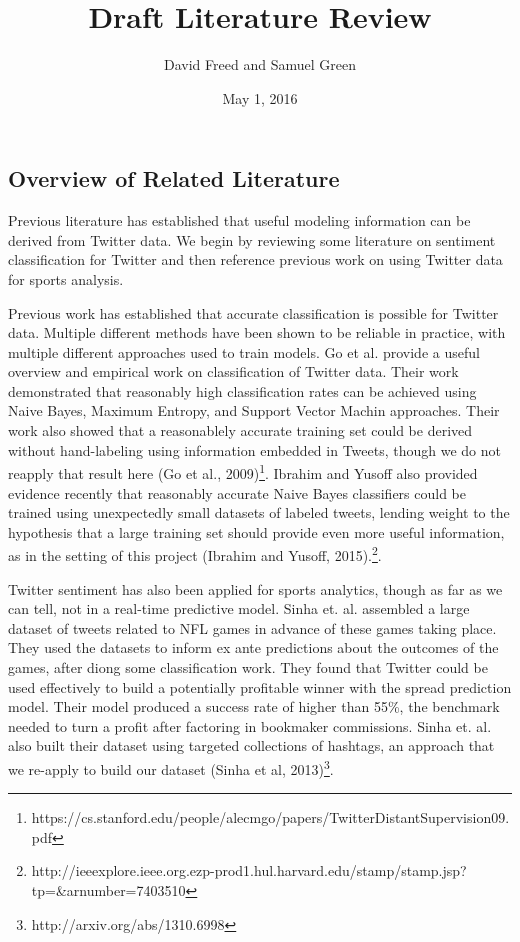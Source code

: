 \documentclass[12pt]{article}
\begin{document}
\setcounter{page}{1}
\begin{doublespacing}

\title{Draft Literature Review}
\author{David Freed and Samuel Green}
\date{May 1, 2016}
\maketitle

\section{Overview of Related Literature}

Previous literature has established that useful modeling information can be
derived from Twitter data. We begin by reviewing some literature
on sentiment classification for Twitter and then reference
previous work on using Twitter data for sports analysis. 

Previous work has established that accurate classification
is possible for Twitter data. Multiple different methods
have been shown to be reliable in practice, with multiple
different approaches used to train models. Go et al. provide
a useful overview and empirical work on
classification of Twitter data. Their work demonstrated
that reasonably high classification rates can be achieved 
using Naive Bayes, Maximum Entropy, and Support Vector Machin
approaches. Their work also showed that a reasonablely
accurate training set could be derived without hand-labeling 
using information embedded in Tweets, though we do not reapply
that result here (Go et al., 2009)\footnote{https://cs.stanford.edu/people/alecmgo/papers/TwitterDistantSupervision09.pdf}. 
Ibrahim and Yusoff also provided evidence recently that
reasonably accurate Naive Bayes classifiers could be 
trained using unexpectedly small datasets of labeled tweets, 
lending weight to the hypothesis that a large training
set should provide even more useful information, as in
the setting of this project (Ibrahim and Yusoff, 2015).\footnote{http://ieeexplore.ieee.org.ezp-prod1.hul.harvard.edu/stamp/stamp.jsp?tp=\&arnumber=7403510}. 


Twitter sentiment has also been applied for sports analytics, 
though as far as we can tell, not in a real-time predictive 
model. Sinha et. al. assembled a large dataset of
tweets related to NFL games in advance of these games
taking place. They used the datasets to inform
ex ante predictions about the outcomes of the games, 
after diong some classification work. They found
that Twitter could be used effectively to 
build a potentially profitable winner with the spread
prediction model. Their model produced a success rate of higher than 55\%, the 
benchmark needed to turn a profit after factoring in
bookmaker commissions. Sinha et. al. also built 
their dataset using targeted collections of hashtags, 
an approach that we re-apply to build our dataset 
(Sinha et al, 2013)\footnote{http://arxiv.org/abs/1310.6998}. 



\end{doublespacing}
\end{document}
